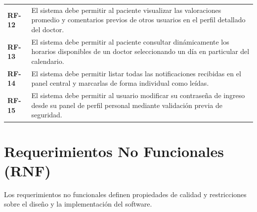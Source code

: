 \documentclass[12pt,a4paper]{report}
\begin{document}
\begin{table}[H]
\begin{tabular}{p{2cm} p{10cm}}
        \textbf{RF-12} & El sistema debe permitir al paciente visualizar las valoraciones promedio y comentarios previos de otros usuarios en el perfil detallado del doctor. \\
        \textbf{RF-13} & El sistema debe permitir al paciente consultar dinámicamente los horarios disponibles de un doctor seleccionando un día en particular del calendario. \\
        \textbf{RF-14} & El sistema debe permitir listar todas las notificaciones recibidas en el panel central y marcarlas de forma individual como leídas. \\
        \textbf{RF-15} & El sistema debe permitir al usuario modificar su contraseña de ingreso desde su panel de perfil personal mediante validación previa de seguridad. \\
        \bottomrule
    \end{tabular}
\end{table}

\section{Requerimientos No Funcionales (RNF)}
Los requerimientos no funcionales definen propiedades de calidad y restricciones sobre el diseño y la implementación del software.
\end{document}

